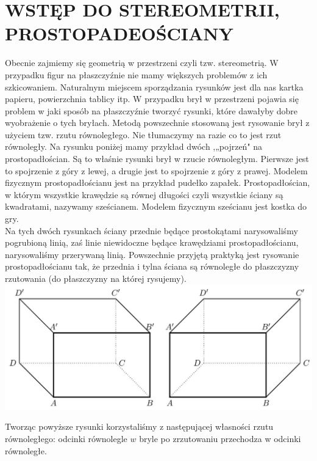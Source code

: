 \documentclass[10pt]{article}
\begin{document}
\section*{WSTĘP DO STEREOMETRII, PROSTOPADEOŚCIANY}
Obecnie zajmiemy się geometrią w przestrzeni czyli tzw. stereometrią. W przypadku figur na płaszczyźnie nie mamy większych problemów z ich szkicowaniem. Naturalnym miejscem sporządzania rysunków jest dla nas kartka papieru, powierzchnia tablicy itp. W przypadku brył w przestrzeni pojawia się problem w jaki sposób na płaszczyźnie tworzyć rysunki, które dawałyby dobre wyobrażenie o tych bryłach. Metodą powszechnie stosowaną jest rysowanie brył z użyciem tzw. rzutu równoległego. Nie tłumaczymy na razie co to jest rzut równoległy. Na rysunku poniżej mamy przykład dwóch ,„pojrzeń" na prostopadłościan. Są to właśnie rysunki brył w rzucie równoległym. Pierwsze jest to spojrzenie z góry z lewej, a drugie jest to spojrzenie z góry z prawej. Modelem fizycznym prostopadłościanu jest na przykład pudełko zapałek. Prostopadłościan, w którym wszystkie krawędzie są równej długości czyli wszystkie ściany są kwadratami, nazywamy sześcianem. Modelem fizycznym sześcianu jest kostka do gry.\\
Na tych dwóch rysunkach ściany przednie będące prostokątami narysowaliśmy pogrubioną linią, zaś linie niewidoczne będące krawędziami prostopadłościanu, narysowaliśmy przerywaną linią. Powszechnie przyjętą praktyką jest rysowanie prostopadłościanu tak, że przednia i tylna ściana są równoległe do płaszczyzny rzutowania (do płaszczyzny na której rysujemy).\\
\includegraphics[max width=\textwidth, center]{2024_11_21_e9b4faa005d5be2cc318g-070}

Tworząc powyższe rysunki korzystaliśmy z następującej własności rzutu równoległego: odcinki równolegle \(w\) bryle po zrzutowaniu przechodza w odcinki równoległe.
\end{document}
